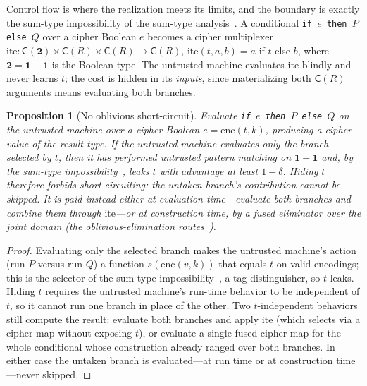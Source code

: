 \documentclass[11pt]{article}
\theoremstyle{definition}
\theoremstyle{plain}
\newtheorem{proposition}[theorem]{Proposition}
\theoremstyle{remark}
\newcommand{\enc}{\mathrm{enc}}
\newcommand{\cipher}[1]{\mathsf{C}(#1)}
\begin{document}
Control flow is where the realization meets its limits, and the
boundary is exactly the sum-type impossibility of
the sum-type analysis~\cite{towell2026algebraic}.
A conditional \texttt{if $e$ then $P$ else $Q$} over a cipher Boolean
$e$ becomes a cipher multiplexer
$\mathrm{ite} : \cipher{\mathbf{2}} \times \cipher{R} \times \cipher{R}
\to \cipher{R}$, $\mathrm{ite}(t, a, b) = a$ if $t$ else $b$, where
$\mathbf{2} = \mathbf{1}+\mathbf{1}$ is the Boolean type.
The untrusted machine evaluates $\mathrm{ite}$ blindly and never learns
$t$; the cost is hidden in its \emph{inputs}, since materializing both
$\cipher{R}$ arguments means evaluating both branches.

\begin{proposition}[No oblivious short-circuit]
\label{prop:no-short-circuit}
Evaluate \texttt{if $e$ then $P$ else $Q$} on the untrusted machine over
a cipher Boolean $e = \enc(t,k)$, producing a cipher value of the result
type.
If the untrusted machine evaluates only the branch selected by $t$, then
it has performed untrusted pattern matching on $\mathbf{1}+\mathbf{1}$
and, by the sum-type impossibility~\cite{towell2026algebraic}, leaks $t$ with advantage at least
$1-\delta$.
Hiding $t$ therefore forbids short-circuiting: the untaken branch's
contribution cannot be skipped.
It is paid instead either at evaluation time---evaluate both branches and
combine them through $\mathrm{ite}$---or at construction time, by a fused
eliminator over the joint domain (the oblivious-elimination routes~\cite{towell2026algebraic}).
\end{proposition}

\begin{proof}
Evaluating only the selected branch makes the untrusted machine's action
(run $P$ versus run $Q$) a function $s(\enc(v,k))$ that equals $t$ on
valid encodings; this is the selector of the sum-type impossibility~\cite{towell2026algebraic},
a tag distinguisher, so $t$ leaks.
Hiding $t$ requires the untrusted machine's run-time behavior to be
independent of $t$, so it cannot run one branch in place of the other.
Two $t$-independent behaviors still compute the result: evaluate both
branches and apply $\mathrm{ite}$ (which selects via a cipher map without
exposing $t$), or evaluate a single fused cipher map for the whole
conditional whose construction already ranged over both branches.
In either case the untaken branch is evaluated---at run time or at
construction time---never skipped.
\end{proof}
\end{document}
